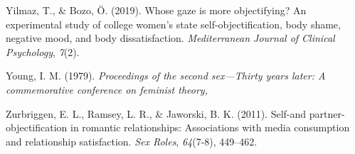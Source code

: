 \documentclass[man]{apa6}
\begin{document}
\hypertarget{ref-yilmaz2019whose}{}
Yilmaz, T., \& Bozo, Ö. (2019). Whose gaze is more objectifying? An
experimental study of college women's state self-objectification, body
shame, negative mood, and body dissatisfaction. \emph{Mediterranean
Journal of Clinical Psychology}, \emph{7}(2).

\hypertarget{ref-young1979}{}
Young, I. M. (1979). \emph{Proceedings of the second sex---Thirty years
later: A commemorative conference on feminist theory,}

\hypertarget{ref-zurbriggen2011self}{}
Zurbriggen, E. L., Ramsey, L. R., \& Jaworski, B. K. (2011). Self-and
partner-objectification in romantic relationships: Associations with
media consumption and relationship satisfaction. \emph{Sex Roles},
\emph{64}(7-8), 449--462.

\endgroup
\end{document}
